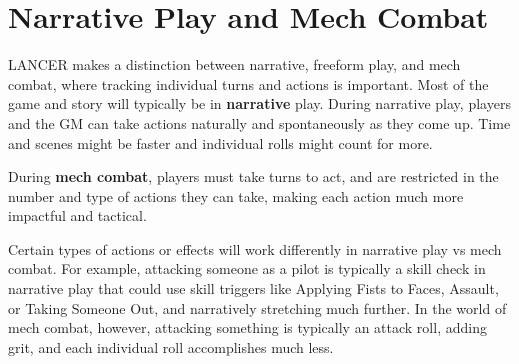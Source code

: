 \chapter{Narrative Play and Mech Combat}

LANCER makes a distinction between narrative, freeform play, and mech combat, where tracking
individual turns and actions is important. Most of the game and story will typically be in \textbf{narrative}
play. During narrative play, players and the GM can take actions naturally and spontaneously as
they come up. Time and scenes might be faster and individual rolls might count for more.

During \textbf{mech combat}, players must take turns to act, and are restricted in the number
and type of actions they can take, making each action much more impactful and tactical.

Certain types of actions or effects will work differently in narrative play vs mech combat.
For example, attacking someone as a pilot is typically a skill check in narrative play that could
use skill triggers like Applying Fists to Faces, Assault, or Taking Someone Out, and narratively
stretching much further. In the world of mech combat, however, attacking something is typically
an attack roll, adding grit, and each individual roll accomplishes much less.